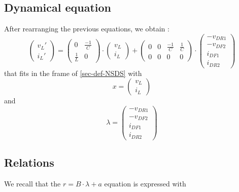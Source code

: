 \documentclass[10pt]{article}
\begin{document}
\subsection{Dynamical equation}
\label{sec-dyn-eq}
After rearranging the previous equations, we obtain :
\[
\left( \begin{array}{c}
v_L'\\
i_L'
\end{array} \right)
=
\left( \begin{array}{cc}
0 & \frac{-1}{C}\\
\frac{1}{L} & 0
\end{array} \right)
 \cdot
\left( \begin{array}{c}
v_L\\
i_L
\end{array} \right)
+
\left( \begin{array}{cccc}
0 & 0 & \frac{-1}{C} & \frac{1}{C}\\
0 & 0 & 0 & 0
\end{array} \right)
 \cdot
\left( \begin{array}{c}
-v_{DR1}\\
-v_{DF2}\\
i_{DF1}\\
i_{DR2}
\end{array} \right)
\]
that fits in the frame of \ref{sec-def-NSDS} with
\[
x =
\left( \begin{array}{c}
v_L\\
i_L
\end{array} \right)
\]
and
\[
\lambda =
\left( \begin{array}{c}
-v_{DR1}\\
-v_{DF2}\\
i_{DF1}\\
i_{DR2}
\end{array} \right)
\]



\subsection{Relations}
We recall that the $r = B \cdot \lambda + a$ equation is expressed with
\end{document}

